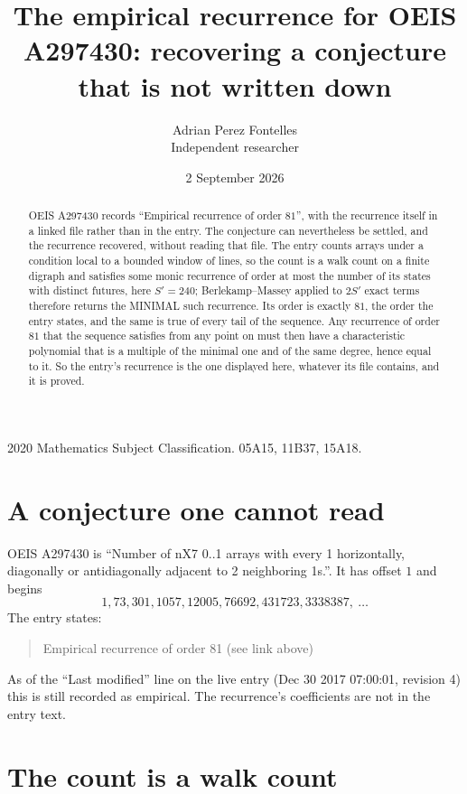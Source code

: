 \documentclass[11pt,a4paper]{article}
\title{The empirical recurrence for OEIS A297430: recovering a conjecture that is not written down}
\author{Adrian Perez Fontelles\\ \small Independent researcher}
\date{2 September 2026}
\theoremstyle{plain}
\theoremstyle{definition}
\begin{document}
\maketitle

\begin{abstract}
OEIS A297430 records ``Empirical recurrence of order $81$'', with the recurrence itself in a
linked file rather than in the entry. The conjecture can nevertheless be settled, and the
recurrence recovered, without reading that file. The entry counts arrays under a condition
local to a bounded window of lines, so the count is a walk count on a finite digraph and
satisfies some monic recurrence of order at most the number of its states with distinct
futures, here $S'=240$; Berlekamp--Massey applied to $2S'$ exact
terms therefore returns the MINIMAL such recurrence. Its order is exactly $81$, the order
the entry states, and the same is true of every tail of the sequence. Any recurrence of order
$81$ that the sequence satisfies from any point on must then have a characteristic
polynomial that is a multiple of the minimal one and of the same degree, hence equal to it. So
the entry's recurrence is the one displayed here, whatever its file contains, and it is
proved.
\end{abstract}

\noindent\small 2020 Mathematics Subject Classification. 05A15, 11B37, 15A18.\normalsize

\section{A conjecture one cannot read}

OEIS A297430 is ``Number of nX7 0..1 arrays with every 1 horizontally, diagonally or antidiagonally adjacent to 2 neighboring 1s.''. It has offset $1$ and begins
\[
1, 73, 301, 1057, 12005, 76692, 431723, 3338387,\ \dots
\]
The entry states:
\begin{quote}
Empirical recurrence of order 81 (see link above)
\end{quote}
As of the ``Last modified'' line on the live entry (Dec 30 2017 07:00:01, revision 4) this is still
recorded as empirical. The recurrence's coefficients are not in the entry text.

\section{The count is a walk count}
\end{document}
